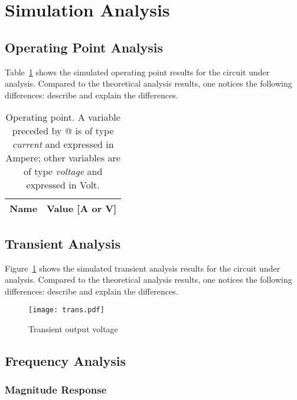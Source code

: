 \section{Simulation Analysis}
\label{sec:simulation}

\subsection{Operating Point Analysis}


Table~\ref{tab:op} shows the simulated operating point results for the circuit under analysis. Compared to the theoretical analysis results, one notices the following differences: describe and explain the differences.

\begin{table}[H]
  \centering
  \begin{tabular}{|l|r|}
    \hline    
    {\bf Name} & {\bf Value [A or V]} \\ \hline
    
  \end{tabular}

  \caption{Operating point. A variable preceded by @ is of type {\em current} and expressed in Ampere; other variables are of type {\it voltage} and expressed in Volt.}
  \label{tab:op}
\end{table}


\subsection{Transient Analysis}

Figure~\ref{fig:trans} shows the simulated transient analysis results for the circuit under analysis. Compared to the theoretical analysis results, one notices the following differences: describe and explain the differences.

\begin{figure}[H] \centering
\texttt{[image: trans.pdf]}
\caption{Transient output voltage}
\label{fig:trans}
\end{figure}


\subsection{Frequency Analysis}

\subsubsection{Magnitude Response}


